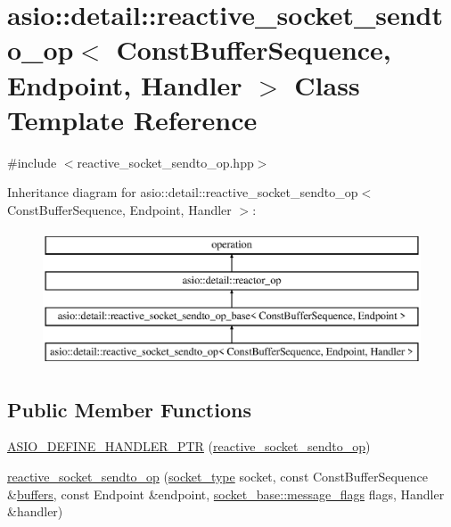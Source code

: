 \hypertarget{classasio_1_1detail_1_1reactive__socket__sendto__op}{}\section{asio\+:\+:detail\+:\+:reactive\+\_\+socket\+\_\+sendto\+\_\+op$<$ Const\+Buffer\+Sequence, Endpoint, Handler $>$ Class Template Reference}
\label{classasio_1_1detail_1_1reactive__socket__sendto__op}


{\ttfamily \#include $<$reactive\+\_\+socket\+\_\+sendto\+\_\+op.\+hpp$>$}

Inheritance diagram for asio\+:\+:detail\+:\+:reactive\+\_\+socket\+\_\+sendto\+\_\+op$<$ Const\+Buffer\+Sequence, Endpoint, Handler $>$\+:\begin{figure}[H]
\begin{center}
\leavevmode
\includegraphics[height=4.000000cm]{classasio_1_1detail_1_1reactive__socket__sendto__op}
\end{center}
\end{figure}
\subsection*{Public Member Functions}
\begin{DoxyCompactItemize}
\item 
\hyperlink{classasio_1_1detail_1_1reactive__socket__sendto__op_aba167322f5af27dedd7061370eba40b4}{A\+S\+I\+O\+\_\+\+D\+E\+F\+I\+N\+E\+\_\+\+H\+A\+N\+D\+L\+E\+R\+\_\+\+P\+T\+R} (\hyperlink{classasio_1_1detail_1_1reactive__socket__sendto__op}{reactive\+\_\+socket\+\_\+sendto\+\_\+op})
\item 
\hyperlink{classasio_1_1detail_1_1reactive__socket__sendto__op_a355645ce5bcdea5b9d951150d6584b17}{reactive\+\_\+socket\+\_\+sendto\+\_\+op} (\hyperlink{namespaceasio_1_1detail_a6798c771dd84b79798b1a08150706ea9}{socket\+\_\+type} socket, const Const\+Buffer\+Sequence \&\hyperlink{group__async__read_ga54dede45c3175148a77fe6635222c47d}{buffers}, const Endpoint \&endpoint, \hyperlink{classasio_1_1socket__base_ac3cf77465dfedfe1979b5415cf32cc94}{socket\+\_\+base\+::message\+\_\+flags} flags, Handler \&handler)
\end{DoxyCompactItemize}
